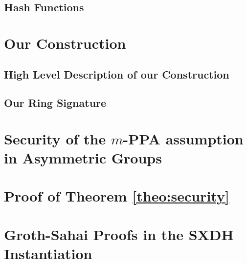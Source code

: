 \documentclass[a4paper,english]{lipics-v2016}
\begin{document}
	\subsection{Hash Functions} \label{sec:hash}

		

    \section{Our Construction} \label{sec:oc}

	
	
	\subsection{High Level Description of our Construction} \label{sec:high-level}
        
        		
    	
	\subsection{Our Ring Signature}\label{sec:our-construction}
        	 





\appendix

	\section{Security of the $m$-PPA assumption in Asymmetric Groups} \label{sec:aPPA}
	
		

	\section{Proof of Theorem \ref{theo:security}} \label{sec:sec-proof}

		

	\section{Groth-Sahai Proofs in the SXDH Instantiation} \label{sec:gs-proofs}
\end{document}
